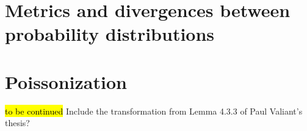 \documentclass[biber]{nowfnt} %
\newcommand{\tbc}{\noindent\hl{\sc{}to be continued}\xspace}
\newcommand{\tbc}{}
\begin{document}
\chapter{Metrics and divergences between probability distributions}
  \label{app:distances}


\chapter{Poissonization}
  \label{app:poissonization}
\tbc
Include the transformation from Lemma 4.3.3 of Paul Valiant's thesis?

\backmatter  %

\printbibliography
\end{document}
